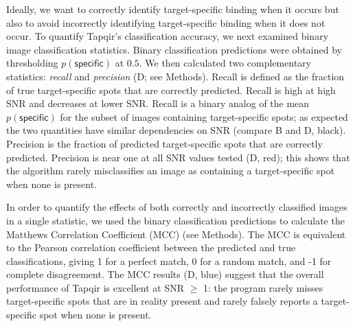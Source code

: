 Ideally, we want to correctly identify target-specific binding when it occurs but also to avoid incorrectly identifying target-specific binding when it does not occur. To quantify Tapqir's classification accuracy, we next examined binary image classification statistics. Binary classification predictions were obtained by thresholding $p(\mathsf{specific})$ at $0.5$. We then calculated two complementary statistics: \textit{recall} and \textit{precision} \citep{Fawcett2006-bq} (D; see Methods). Recall is defined as the fraction of true target-specific spots that are correctly predicted. Recall is high at high SNR and decreases at lower SNR. Recall is a binary analog of the mean $p(\mathsf{specific})$ for the subset of images containing target-specific spots; as expected the two quantities have similar dependencies on SNR (compare B and D, black). Precision is the fraction of predicted target-specific spots that are correctly predicted. Precision is near one at all SNR values tested (D, red); this shows that the algorithm rarely misclassifies an image as containing a target-specific spot when none is present. 

In order to quantify the effects of both correctly and incorrectly classified images in a single statistic, we used the binary classification predictions to calculate the Matthews Correlation Coefficient (MCC) \citep{Matthews1975-rw} (see Methods). The MCC is equivalent to the Pearson correlation coefficient between the predicted and true classifications, giving 1 for a perfect match, 0 for a random match, and -1 for complete disagreement. The MCC results (D, blue) suggest that the overall performance of Tapqir is excellent at SNR $\ge$ 1: the program rarely misses target-specific spots that are in reality present and rarely falsely reports a target-specific spot when none is present.  

